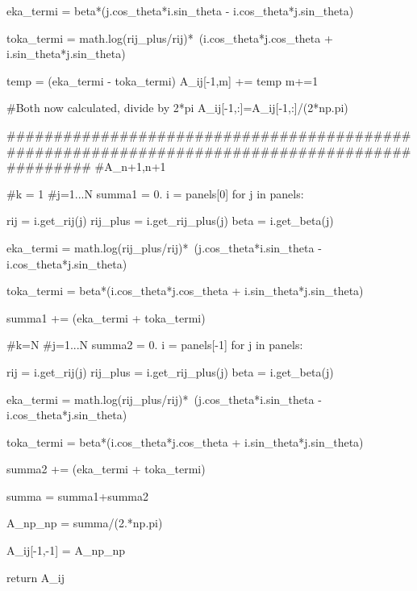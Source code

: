 \documentclass[a4paper,12pt]{article}
\begin{document}
\begin{python}
                eka_termi = beta*(j.cos_theta*i.sin_theta - i.cos_theta*j.sin_theta)

                toka_termi = math.log(rij_plus/rij)*\
                         (i.cos_theta*j.cos_theta + i.sin_theta*j.sin_theta)
                
                temp = (eka_termi - toka_termi)
                A_ij[-1,m] += temp
                m+=1
                
        #Both now calculated, divide by 2*pi
        A_ij[-1,:]=A_ij[-1,:]/(2*np.pi)

        ###############################################################################################
                                                #A_n+1,n+1

        
        
        #k = 1
        #j=1...N
        summa1 = 0.      
        i = panels[0]        
        for j in panels:

                rij = i.get_rij(j)
                rij_plus = i.get_rij_plus(j)
                beta = i.get_beta(j)                        

                eka_termi = math.log(rij_plus/rij)*\
		(j.cos_theta*i.sin_theta - i.cos_theta*j.sin_theta)
              
                toka_termi = beta*(i.cos_theta*j.cos_theta + i.sin_theta*j.sin_theta)
                         
                summa1 += (eka_termi + toka_termi)


        #k=N
        #j=1...N
        summa2 = 0.
        i = panels[-1]        
        for j in panels:

                rij = i.get_rij(j)
                rij_plus = i.get_rij_plus(j)
                beta = i.get_beta(j)                        

                eka_termi = math.log(rij_plus/rij)*\
                      (j.cos_theta*i.sin_theta - i.cos_theta*j.sin_theta)
              
                toka_termi = beta*(i.cos_theta*j.cos_theta + i.sin_theta*j.sin_theta)
                         
                summa2 += (eka_termi + toka_termi)
        

        summa = summa1+summa2

        A_np_np = summa/(2.*np.pi)
        
        A_ij[-1,-1] = A_np_np        
               
        return A_ij
\end{python}
\end{document}
